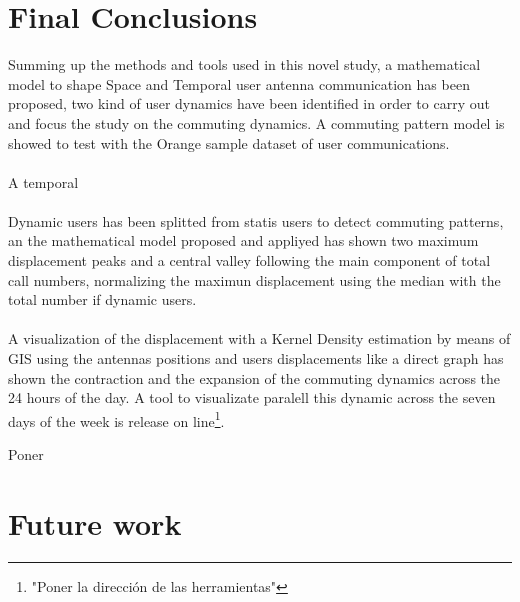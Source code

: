 \newpage
\section{Final Conclusions}

Summing up the methods and tools used in this novel study, a mathematical model to shape Space and Temporal user antenna communication has been proposed, two kind of user dynamics have been identified in order to carry out and focus the study on the commuting dynamics. A commuting pattern model is showed to test with the Orange sample dataset of user communications.
\\
\\
A temporal 
\\
\\
Dynamic users has been splitted from statis users to detect commuting patterns, an the mathematical model proposed and appliyed has shown two maximum displacement peaks and a central valley following the main component of total call numbers, normalizing the maximun displacement using the median with the total number if dynamic users.
\\
\\
A visualization of the displacement with a Kernel Density estimation by means of GIS using the antennas positions and users displacements like a direct graph has shown the contraction and the expansion of the commuting dynamics across the 24 hours of the day.  A tool to visualizate paralell this dynamic  across the seven days of the week is release on line\footnote{"Poner la dirección de las herramientas"}.

{\color{red} Poner }



\section{Future work}
